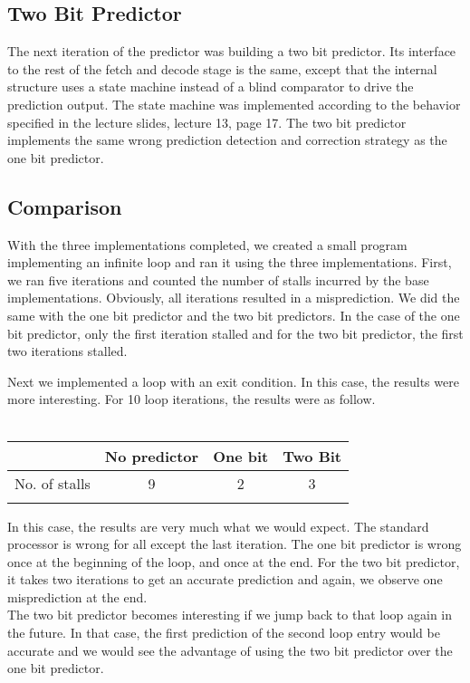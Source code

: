 \documentclass[12pt]{IEEEtran} %
\begin{document}
\subsection{Two Bit Predictor} %
\label{sub:2_bit_predictor}
The next iteration of the predictor was building a two bit predictor. Its interface to the rest of the fetch and decode stage is the same, except that the internal structure uses a state machine instead of a blind comparator to drive the prediction output. The state machine was implemented according to the behavior specified in the lecture slides, lecture 13, page 17. The two bit predictor implements the same wrong prediction detection and correction strategy as the one bit predictor. 

\subsection{Comparison} %
\label{sub:comparison}
With the three implementations completed, we created a small program implementing an infinite loop and ran it using the three implementations. First, we ran five iterations and counted the number of stalls incurred by the base implementations. Obviously, all iterations resulted in a misprediction. We did the same with the one bit predictor and the two bit predictors. In the case of the one bit predictor, only the first iteration stalled and for the two bit predictor, the first two iterations stalled.

Next we implemented a loop with an exit condition. In this case, the results were more interesting. For 10 loop iterations, the results were as follow.\\
\\
\begin{tabular}{c c c c}
& No predictor & One bit & Two Bit \\
\hline
No. of stalls & 9 & 2 & 3 \\
\hline
\\
\end{tabular}

In this case, the results are very much what we would expect. The standard processor is wrong for all except the last iteration. The one bit predictor is wrong once at the beginning of the loop, and once at the end. For the two bit predictor, it takes two iterations to get an accurate prediction and again, we observe one misprediction at the end. \\
The two bit predictor becomes interesting if we jump back to that loop again in the future. In that case, the first prediction of the second loop entry would be accurate and we would see the advantage of using the two bit predictor over the one bit predictor. 
\end{document}
